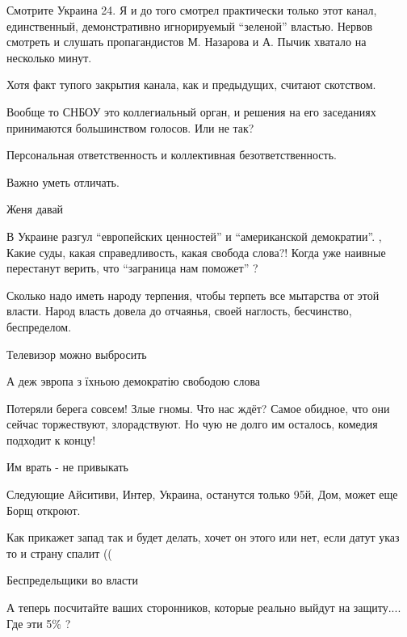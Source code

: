 \begin{itemize}
\begin{itemize}
Смотрите Украина 24. Я и до того смотрел практически только этот канал,
единственный, демонстративно игнорируемый \enquote{зеленой} властью. Нервов
смотреть и слушать пропагандистов М. Назарова и А. Пычик хватало на несколько
минут.

Хотя факт тупого закрытия канала, как и предыдущих, считают скотством.

\end{itemize} %



Вообще то СНБОУ это коллегиальный орган, и решения на его заседаниях
принимаются большинством голосов. Или не так?

Персональная ответственность и коллективная безответственность.

Важно уметь отличать.


Женя давай


В Украине разгул \enquote{европейских ценностей} и \enquote{американской демократии}. , Какие
суды, какая справедливость, какая свобода слова?! Когда уже наивные перестанут
верить, что \enquote{заграница нам поможет} ?


Сколько надо иметь народу терпения, чтобы терпеть все мытарства от этой власти.
Народ власть довела до отчаянья, своей наглость, бесчинство, беспределом.

Телевизор можно выбросить

А деж эвропа з їхньою демократію свободою слова


Потеряли берега совсем! Злые гномы. Что нас ждёт? Самое обидное, что они сейчас
торжествуют, злорадствуют. Но чую не долго им осталось, комедия подходит к
концу!

Им врать - не привыкать

Следующие Айситиви, Интер, Украина, останутся только 95й, Дом, может еще Борщ откроют.

Как прикажет запад так и будет делать, хочет он этого или нет, если датут указ то и страну спалит ((

Беспредельщики во власти

А теперь посчитайте ваших сторонников, которые реально выйдут на защиту.... Где эти 5\% ?


\end{itemize}
